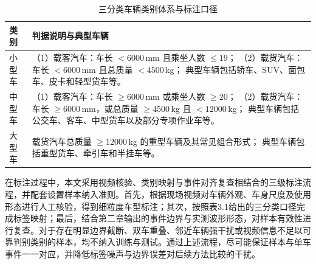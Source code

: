 \begin{table}[!htbp]
\centering
\small
\caption{三分类车辆类别体系与标注口径}
\label{tab:ch3_label_rule}
\renewcommand{\arraystretch}{1.25}
\setlength{\tabcolsep}{4pt}
\begin{tabular}{p{2.0cm} p{10.8cm}}
\hline
类别 & 判据说明与典型车辆 \\
\hline
小型车 &
（1）载客汽车：车长 $<6000$\,mm 且乘坐人数 $\le 19$；
（2）载货汽车：车长 $<6000$\,mm 且总质量 $<4500$\,kg；
典型车辆包括轿车、SUV、面包车、皮卡和轻型货车等。\\
中型车 &
（1）载客汽车：车长 $\ge 6000$\,mm 或乘坐人数 $\ge 20$；
（2）载货汽车：车长 $\ge 6000$\,mm，或总质量 $\ge 4500$\,kg 且 $<12000$\,kg；
典型车辆包括公交车、客车、中型货车以及部分专项作业车等。\\
大型车 &
载货汽车总质量 $\ge 12000$\,kg 的重型车辆及其常见组合形式；
典型车辆包括重型货车、牵引车和半挂车等。\\
\hline
\end{tabular}
\end{table}

在标注过程中，本文采用视频核验、类别映射与事件对齐复查相结合的三级标注流程，并配套设置样本纳入准则。首先，根据现场视频对车辆外观、车身尺度及使用形态进行人工核验，得到细粒度车型标注；其次，按照表3.1给出的三分类口径完成标签映射；最后，结合第二章输出的事件边界与实测波形形态，对样本有效性进行复查。对于存在明显边界截断、双车重叠、邻近车辆强干扰或视频信息不足以可靠判别类别的样本，均不纳入训练与测试。通过上述流程，尽可能保证样本与单车事件一一对应，并降低标签噪声与边界误差对后续方法比较的干扰。

